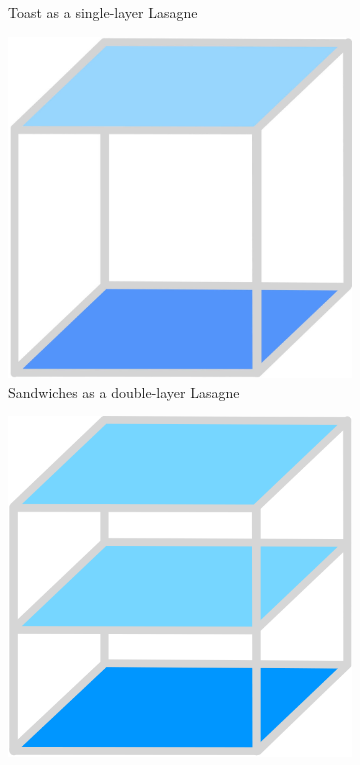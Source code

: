 \documentclass{beamer}
\begin{document}
\begin{frame}
\begin{figure}
\begin{subfigure}{.24\textwidth}
          \caption{\label{fig:toast-lasagne}Toast as a single-layer Lasagne}
        \end{subfigure}
        \begin{subfigure}{.24\textwidth}
          \centering
          \includegraphics[width=\linewidth]{sandwich/18_sandwich.jpg}
          \caption{\label{fig:sandwich-lasagne}Sandwiches as a double-layer Lasagne}
        \end{subfigure}
        \begin{subfigure}{.24\textwidth}
          \centering
          \includegraphics[width=\linewidth]{cake/32_cake.png}

\end{subfigure}
\end{figure}
\end{frame}
\end{document}
